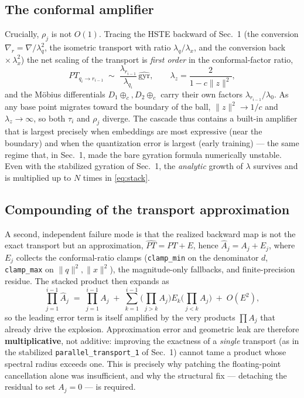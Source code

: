 \documentclass{article}
\begin{document}
\subsection*{The conformal amplifier}
Crucially, $\rho_j$ is not $O(1)$. Tracing the HSTE backward of Sec.~1 (the conversion $\nabla_r = \nabla/\lambda_q^2$, the isometric transport with ratio $\lambda_q/\lambda_x$, and the conversion back $\times\,\lambda_x^2$) the net scaling of the transport is \emph{first order} in the conformal-factor ratio,
\begin{equation}
    PT_{q_i\to r_{i-1}} \;\sim\; \frac{\lambda_{r_{i-1}}}{\lambda_{q_i}}\,\widehat{\mathrm{gyr}},
    \qquad \lambda_z = \frac{2}{1 - c\|z\|^2},
\end{equation}
and the Möbius differentials $D_1\oplus_c, D_2\oplus_c$ carry their own factors $\lambda_{r_{i-1}}/\lambda_0$. As any base point migrates toward the boundary of the ball, $\|z\|^2 \to 1/c$ and $\lambda_z \to \infty$, so both $\tau_i$ and $\rho_j$ diverge. The cascade thus contains a built-in amplifier that is largest precisely when embeddings are most expressive (near the boundary) and when the quantization error is largest (early training) --- the same regime that, in Sec.~1, made the bare gyration formula numerically unstable. Even with the stabilized gyration of Sec.~1, the \emph{analytic} growth of $\lambda$ survives and is multiplied up to $N$ times in \eqref{eq:stack}.

\subsection*{Compounding of the transport approximation}
A second, independent failure mode is that the realized backward map is not the exact transport but an approximation, $\widehat{PT} = PT + E$, hence $\widehat{A}_j = A_j + E_j$, where $E_j$ collects the conformal-ratio clamps (\texttt{clamp\_min} on the denominator $d$, \texttt{clamp\_max} on $\|q\|^2,\|x\|^2$), the magnitude-only fallbacks, and finite-precision residue. The stacked product then expands as
\begin{equation}
    \prod_{j=1}^{i-1}\widehat{A}_j
    \;=\; \prod_{j=1}^{i-1} A_j
    \;+\; \sum_{k=1}^{i-1}\Big(\!\!\prod_{j>k} A_j\Big) E_k \Big(\!\!\prod_{j<k} A_j\Big)
    \;+\; O(E^2),
\end{equation}
so the leading error term is itself amplified by the very products $\prod A_j$ that already drive the explosion. Approximation error and geometric leak are therefore \textbf{multiplicative}, not additive: improving the exactness of a \emph{single} transport (as in the stabilized \texttt{parallel\_transport\_1} of Sec.~1) cannot tame a product whose spectral radius exceeds one. This is precisely why patching the floating-point cancellation alone was insufficient, and why the structural fix --- detaching the residual to set $A_j = 0$ --- is required.
\end{document}
